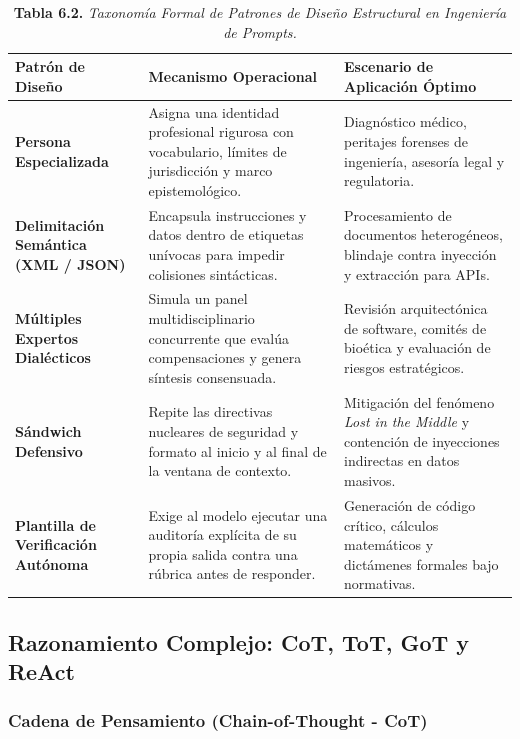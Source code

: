 \begin{table}[htpb!]
\centering
\small
\renewcommand{\arraystretch}{1.3}
\begin{tabularx}{\textwidth}{>{\raggedright\arraybackslash\bfseries}p{3.2cm} >{\raggedright\arraybackslash}p{3.8cm} >{\raggedright\arraybackslash}X}
\toprule
Patrón de Diseño & Mecanismo Operacional & Escenario de Aplicación Óptimo \\
\midrule
Persona Especializada & Asigna una identidad profesional rigurosa con vocabulario, límites de jurisdicción y marco epistemológico. & Diagnóstico médico, peritajes forenses de ingeniería, asesoría legal y regulatoria. \\
Delimitación Semántica (XML / JSON) & Encapsula instrucciones y datos dentro de etiquetas unívocas para impedir colisiones sintácticas. & Procesamiento de documentos heterogéneos, blindaje contra inyección y extracción para APIs. \\
Múltiples Expertos Dialécticos & Simula un panel multidisciplinario concurrente que evalúa compensaciones y genera síntesis consensuada. & Revisión arquitectónica de software, comités de bioética y evaluación de riesgos estratégicos. \\
Sándwich Defensivo & Repite las directivas nucleares de seguridad y formato al inicio y al final de la ventana de contexto. & Mitigación del fenómeno \textit{Lost in the Middle} y contención de inyecciones indirectas en datos masivos. \\
Plantilla de Verificación Autónoma & Exige al modelo ejecutar una auditoría explícita de su propia salida contra una rúbrica antes de responder. & Generación de código crítico, cálculos matemáticos y dictámenes formales bajo normativas. \\
\bottomrule
\end{tabularx}
\caption{\textbf{Tabla 6.2.} \textit{Taxonomía Formal de Patrones de Diseño Estructural en Ingeniería de Prompts.}}
\label{tab:prompt_patterns}
\end{table}

\newpage
\subsection{Razonamiento Complejo: CoT, ToT, GoT y ReAct}

\subsubsection{Cadena de Pensamiento (Chain-of-Thought - CoT)}

